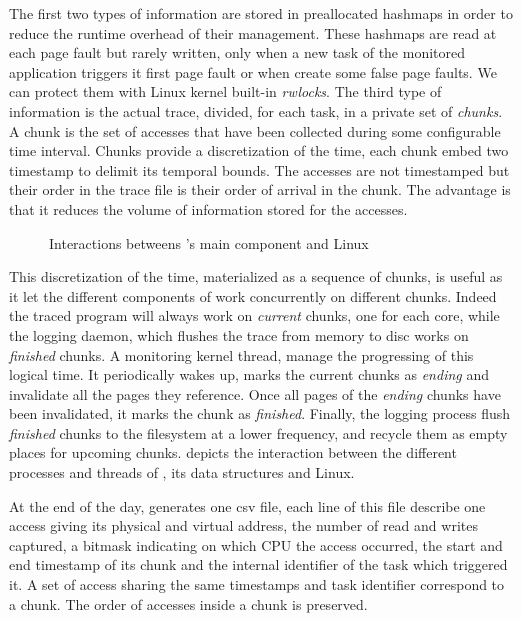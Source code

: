 The first two types of information are stored in preallocated hashmaps in order to reduce the
runtime overhead of their management.  These hashmaps are read at each page fault but rarely
written, only when a new task of the monitored application triggers it first page
fault or when \Moca create some false page faults. We can protect
them with Linux kernel built-in \emph{rwlocks}.
The third type of information is the actual
trace, divided, for each task, in a private set of \emph{chunks}. A chunk is the set of
accesses that have been collected during some configurable time interval. Chunks provide a discretization
of the time, each chunk embed two timestamp to delimit its temporal bounds.
The accesses are not timestamped but their order in the trace file is their
order of arrival in the chunk.
The advantage is that it reduces the volume of information stored for the accesses.

\begin{figure}[htb]
    \centering
    \caption{Interactions betweens \Moca's main component and Linux}
    \label{fig:moca}
\end{figure}

This discretization of the time, materialized as a sequence of chunks, is useful as it let the
different components of \Moca work concurrently on different chunks.  Indeed the traced
program will always work on \emph{current} chunks, one for each core, while the logging daemon,
which flushes the trace from memory to disc works on \emph{finished} chunks. A
monitoring kernel thread, manage the progressing of this logical time. It periodically wakes up, marks the current chunks as
\emph{ending} and invalidate all the pages they reference. Once all pages of the \emph{ending}
chunks have been invalidated, it marks the chunk as \emph{finished}. Finally, the
logging process flush \emph{finished} chunks to the filesystem at a lower
frequency, and recycle them as empty places for upcoming chunks.   depicts the interaction between the
different processes and threads of \Moca, its data structures and Linux.

At the end of the day, \Moca generates one csv file, each line of this file
describe one access giving its physical and virtual address, the number of
read and writes captured, a bitmask indicating on which CPU the access
occurred, the start and end timestamp of its chunk and the
internal identifier of the task which triggered it. A set of access sharing the same
timestamps and task identifier correspond to a chunk. The order of accesses inside a
chunk is preserved.

